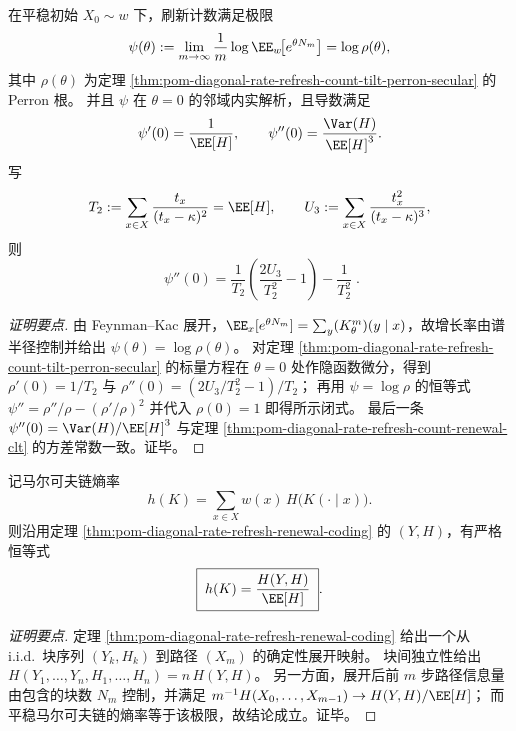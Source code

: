 \begin{corollary}\label{cor:pom-diagonal-rate-refresh-count-scgf-derivatives}
在平稳初始 \(X_0\sim w\) 下，刷新计数满足极限
\[
\psi(\theta):=\lim_{m\to\infty}\frac{1}{m}\log \EE_w\!\bigl[e^{\theta N_m}\bigr]=\log\rho(\theta),
\]
其中 \(\rho(\theta)\) 为定理 \ref{thm:pom-diagonal-rate-refresh-count-tilt-perron-secular} 的 Perron 根。
并且 \(\psi\) 在 \(\theta=0\) 的邻域内实解析，且导数满足
\[
\psi'(0)=\frac{1}{\EE[H]},
\qquad
\psi''(0)=\frac{\Var(H)}{\EE[H]^3}.
\]
写
\[
T_2:=\sum_{x\in X}\frac{t_x}{(t_x-\kappa)^2}=\EE[H],
\qquad
U_3:=\sum_{x\in X}\frac{t_x^{2}}{(t_x-\kappa)^3},
\]
则
\[
\boxed{\;
\psi''(0)=\frac{1}{T_2}\left(\frac{2U_3}{T_2^2}-1\right)-\frac{1}{T_2^2}\; } .
\]
\end{corollary}
\begin{proof}[证明要点]
由 Feynman--Kac 展开，\(\EE_x[e^{\theta N_m}]=\sum_y (K_\theta^m)(y\mid x)\)，故增长率由谱半径控制并给出 \(\psi(\theta)=\log\rho(\theta)\)。
对定理 \ref{thm:pom-diagonal-rate-refresh-count-tilt-perron-secular} 的标量方程在 \(\theta=0\) 处作隐函数微分，得到
\(
\rho'(0)=1/T_2
\)
与
\(
\rho''(0)=(2U_3/T_2^2-1)/T_2
\)；
再用 \(\psi=\log\rho\) 的恒等式 \(\psi''=\rho''/\rho-(\rho'/\rho)^2\) 并代入 \(\rho(0)=1\) 即得所示闭式。
最后一条 \(\psi''(0)=\Var(H)/\EE[H]^3\) 与定理 \ref{thm:pom-diagonal-rate-refresh-count-renewal-clt} 的方差常数一致。证毕。
\end{proof}

\begin{proposition}[熵率的再生编码公式]\label{prop:pom-diagonal-rate-refresh-entropy-rate-renewal-coding-secondary}
记马尔可夫链熵率
\[
h(K)=\sum_{x\in X} w(x)\,H\!\bigl(K(\cdot\mid x)\bigr).
\]
则沿用定理 \ref{thm:pom-diagonal-rate-refresh-renewal-coding} 的 \((Y,H)\)，有严格恒等式
\[
\boxed{\;
h(K)=\frac{H(Y,H)}{\EE[H]}\; } .
\]
\end{proposition}
\begin{proof}[证明要点]
定理 \ref{thm:pom-diagonal-rate-refresh-renewal-coding} 给出一个从 i.i.d.\ 块序列 \((Y_k,H_k)\) 到路径 \((X_m)\) 的确定性展开映射。
块间独立性给出 \(H(Y_1,\dots,Y_n,H_1,\dots,H_n)=n\,H(Y,H)\)。
另一方面，展开后前 \(m\) 步路径信息量由包含的块数 \(N_m\) 控制，并满足
\(
m^{-1}H(X_0,\dots,X_{m-1})\to H(Y,H)/\EE[H]
\)；
而平稳马尔可夫链的熵率等于该极限，故结论成立。证毕。
\end{proof}

\endinput
